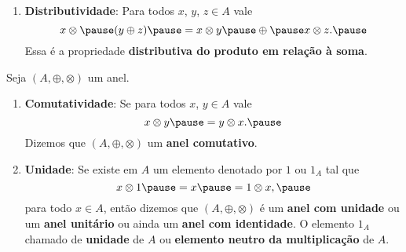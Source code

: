 \documentclass{beamer}
\begin{document}
    \begin{frame}
        \begin{definicao}
            \begin{enumerate}[label={\roman*})]
                \conti

                \item \textbf{Distributividade}: \pause Para todos $x$, \pause $y$, \pause $z \in A$ \pause vale\pause
                \[
                    x \otimes \pause (y \oplus z) \pause = x \otimes y \pause \oplus \pause x\otimes z.\pause
                \]
                Essa {\'e} a propriedade \textbf{distributiva do produto em rela{\c c}{\~a}o {\`a} soma}.\pause
            \end{enumerate}
        \end{definicao}
    \end{frame}

    \begin{frame}
        \begin{observacoes}
            Seja $(A, \oplus, \otimes)$ \pause um anel.\pause
            \begin{enumerate}[label={\arabic*})]
                \item \textbf{Comutatividade}: Se para todos $x$, \pause $y \in A$ \pause vale
                \[
                    x \otimes y \pause = y \otimes x.\pause
                \]
                Dizemos que $(A, \oplus, \otimes)$  um \textbf{anel comutativo}.\pause

                \vspace{.7cm}

                \item \textbf{Unidade}: \pause Se existe em $A$ \pause um elemento denotado por $1$ \pause ou $1_{A}$ \pause tal que\pause
                \[
                    x \otimes 1 \pause = x \pause = 1 \otimes x,\pause
                \]
                para todo $x \in A$, \pause ent{\~a}o dizemos que $(A, \oplus, \otimes)$ \pause \'e um \textbf{anel com unidade} \pause ou um \textbf{anel unit{\'a}rio} ou ainda um \textbf{anel com identidade}. \pause O elemento $1_A$  chamado de \textbf{unidade} de $A$ \pause ou \textbf{elemento neutro da multiplica\c{c}\~ao} \pause de $A$.\pause

                \vspace{.7cm}

                \seti
             \end{enumerate}
        \end{observacoes}
    \end{frame}
\end{document}
